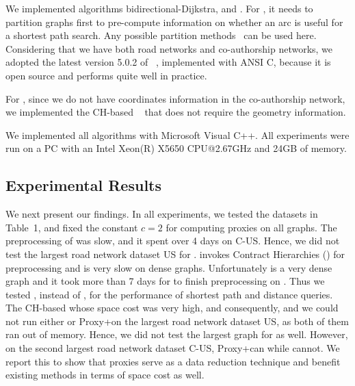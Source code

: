  We implemented algorithms bidirectional-Dijkstra, \arcflag and \tnr.
For \arcflag, it needs to partition graphs first to pre-compute information on whether an arc is useful for a shortest path search. Any possible partition methods~\cite{kl70,Karypis98,YangYZK12, delling2011graph} can be used here. Considering that we have both road networks and co-authorship networks, we adopted the latest version 5.0.2 of \metis~\cite{metis}, implemented with ANSI C, because it is open source and performs quite well in practice.

For \tnr, since we do not have coordinates information in the co-authorship network, we implemented the CH-based \tnr~\cite{arz2013transit} that does not require the geometry information.



 We implemented all algorithms with Microsoft Visual C++. All experiments were run on a PC with an Intel Xeon(R) X5650 CPU@2.67GHz and 24GB of memory.





\subsection{Experimental Results}

We next present our findings. In all experiments, we tested the datasets in Table~1, and fixed the constant $c = 2$ for computing proxies on all graphs.
The preprocessing of \arcflag was slow, and it spent over 4 days on C-US. Hence, we did not test the largest road network dataset US for \arcflag.
\tnr invokes Contract Hierarchies (\ch) for preprocessing and \ch is very slow on dense graphs. Unfortunately \dblp is a very dense graph and it took more than 7 days for \ch to finish preprocessing on \dblp. Thus we tested \dblpone, instead of \dblp, for the performance of shortest path and distance queries.
The CH-based \tnr whose space cost was very high, and consequently, and we could not run either \tnr or Proxy+\tnr on the largest road network dataset US, as both of them ran out of memory. Hence, we did not test the largest graph for \tnr as well. However, on the second largest road network dataset C-US, Proxy+\tnr can while \tnr cannot. We report this to show that proxies serve as a data reduction technique and benefit existing methods in terms of space cost as well.




